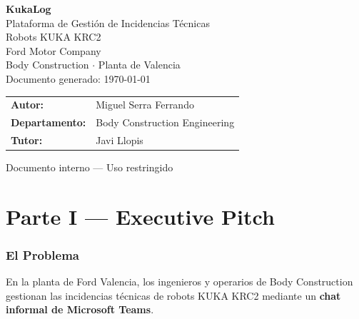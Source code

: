 \documentclass[11pt,a4paper]{article}
\begin{document}

\begin{titlepage}
\centering
\vspace*{3cm}

{\Huge\bfseries\color{fordblue} KukaLog}\\[0.5cm]
{\Large Plataforma de Gestión de Incidencias Técnicas}\\[0.3cm]
{\large Robots KUKA KRC2}\\[2cm]

{\large Ford Motor Company}\\
{\large Body Construction $\cdot$ Planta de Valencia}\\[2cm]

{\normalsize Documento generado: \today}\\[4cm]

\begin{tabular}{ll}
\textbf{Autor:} & Miguel Serra Ferrando \\
\textbf{Departamento:} & Body Construction Engineering \\
\textbf{Tutor:} & Javi Llopis \\
\end{tabular}

\vfill
{\small\color{darkgray} Documento interno --- Uso restringido}
\end{titlepage}


\tableofcontents
\newpage


\part*{Parte I --- Executive Pitch}

\section{El Problema}

En la planta de Ford Valencia, los ingenieros y operarios de Body Construction gestionan las incidencias técnicas de robots KUKA KRC2 mediante un \textbf{chat informal de Microsoft Teams}.
\end{document}
